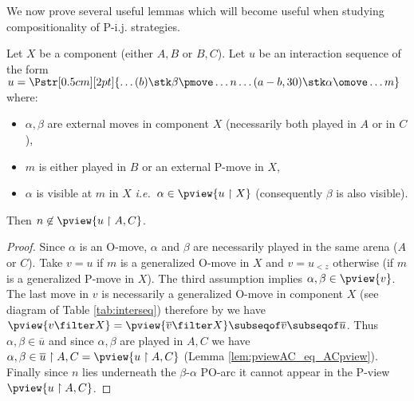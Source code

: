 We now prove several useful lemmas which will become useful when studying compositionality of P-i.j. strategies.
\begin{lemma}
\label{lem:interjump}
Let $X$ be a component (either  $A,B$ or  $B,C$).
Let $u$ be an interaction sequence of the form
$ u =  
\Pstr[0.5cm][2pt]{ \ldots (b){\stk \beta \pmove}  \ldots
 {n}  \ldots  (a-b,30){\stk \alpha\omove}
\ldots m}$ where:
\begin{itemize}[-]
\item $\alpha,\beta$ are external moves in component $X$ (necessarily both played in $A$ or in $C$),
\item  $m$ is either played in $B$ or an external P-move in $X$,
\item  $\alpha$ is visible at $m$ in $X$ \emph{i.e.}~$\alpha\in \pview{u \upharpoonright X}$ (consequently $\beta$ is also visible).
\end{itemize}
Then $n \not\in \pview{u \upharpoonright A, C}$.
\end{lemma}
\begin{proof}
Since $\alpha$ is an O-move, $\alpha$ and $\beta$ are necessarily played in the same arena ($A$ or $C$).
Take $v=u$ if $m$ is a generalized O-move in $X$
and $v=u_{<z}$ otherwise (if $m$ is a generalized P-move in $X$).
The third assumption implies 
$\alpha,\beta\in \pview{v}$.
The last move in $v$ is necessarily a generalized O-move in component $X$ (see diagram of Table \ref{tab:interseq}) 
therefore by \cite[Lemma 3.3.1]{Harmer2005}
we have $\pview{v \filter X} = \pview{\overline{v} \filter X} \subseqof \overline{v} \subseqof \overline{u}$.
Thus $\alpha,\beta \in \overline{u}$ and
since $\alpha,\beta$ are played in $A,C$ we have 
$\alpha,\beta  \in \overline{u} \upharpoonright A,C 
= \pview{u \upharpoonright A,C}$ (Lemma \ref{lem:pviewAC_eq_ACpview}).
Finally since $n$ lies underneath the $\beta$-$\alpha$ PO-arc 
it cannot appear in the P-view  $\pview{u \upharpoonright A,C}$.
\end{proof}

